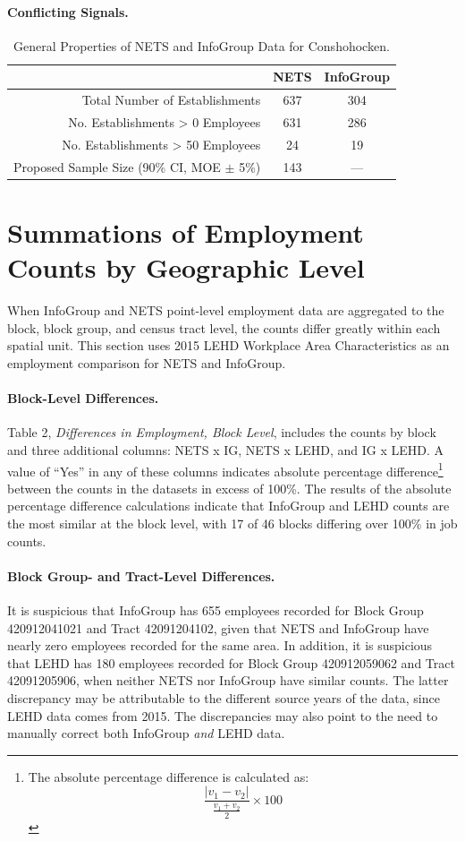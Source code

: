 \documentclass[paper = letter, fontsize = 11pt]{scrartcl}
\begin{document}
\paragraph{Conflicting Signals.}
\begin{table}[h]
	\begin{center}
		\begin{tabular}{ r | c c }
			 & NETS & InfoGroup  \\
			\hline
			\hline
			Total Number of Establishments & 637 & 304 \\
			\hline 
			No. Establishments > 0 Employees & 631 & 286 \\
			\hline 
			No. Establishments > 50 Employees & 24 & 19 \\
			\hline
			Proposed Sample Size (90\% CI, MOE $\pm$ 5\%) & 143 & --- \\
			\hline  
		\end{tabular}
	\end{center}
	\caption{General Properties of NETS and InfoGroup Data for Conshohocken.}
\end{table}
\clearpage
\section{Summations of Employment Counts by Geographic Level}
When InfoGroup and NETS point-level employment data are aggregated to the block, block group, and census tract level, the counts differ greatly within each spatial unit. This section uses 2015 LEHD Workplace Area Characteristics as an employment comparison for NETS and InfoGroup.
\paragraph{Block-Level Differences.} Table 2, \textit{Differences in Employment, Block Level}, includes the counts by block and three additional columns: NETS x IG, NETS x LEHD, and IG x LEHD. A value of ``Yes'' in any of these columns indicates absolute percentage difference\footnote{The absolute percentage difference is calculated as: \[ \frac{\lvert v_{1} - v_{2} \rvert}{\frac{v_{1} + v_{2}}{2}} \times 100 \]} between the counts in the datasets in excess of 100\%. The results of the absolute percentage difference calculations indicate that InfoGroup and LEHD counts are the most similar at the block level, with 17 of 46 blocks differing over 100\% in job counts.
\paragraph{Block Group- and Tract-Level Differences.} It is suspicious that InfoGroup has 655 employees recorded for Block Group 420912041021 and Tract 42091204102, given that NETS and InfoGroup have nearly zero employees recorded for the same area. In addition, it is suspicious that LEHD has 180 employees recorded for Block Group 420912059062 and Tract 42091205906, when neither NETS nor InfoGroup have similar counts. The latter discrepancy may be attributable to the different source years of the data, since LEHD data comes from 2015. The discrepancies may also point to the need to manually correct both InfoGroup \textit{and} LEHD data.
\end{document}
